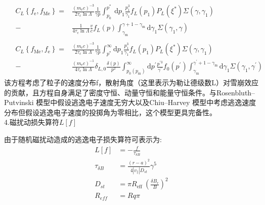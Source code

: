 \begin{align}
 &\begin{aligned}
C_{L}\left\{f_{\mathrm{e}}, f_{\mathrm{Me}}\right\} =& \frac{\left(m_{\mathrm{e}} c\right)^{-3}}{2 \tau_{\mathrm{c}} \ln \Lambda} \frac{1}{\gamma p} \int_{p_{0}}^{p^{*}} \mathrm{~d} p_{1} \frac{p_{1}^{3}}{\gamma_{1}} f_{L}\left(p_{1}\right) P_{L}\left(\xi^{*}\right) \Sigma\left(\gamma, \gamma_{1}\right) \\
- &\frac{1}{4 \tau_{\mathrm{c}} \ln \Lambda} \frac{v}{c} f_{L}(p) \int_{\gamma_{\mathrm{m}}}^{\gamma+1-\gamma_{\mathrm{m}}} \mathrm{d} \gamma_{1} \Sigma\left(\gamma_{1}, \gamma\right) 
\end{aligned} \label{eq:CLfefMe} \\ 
 &\begin{aligned}
C_{L}\left\{f_{\mathrm{Me}}, f_{\mathrm{e}}\right\}  =& \frac{\left(m_{\mathrm{e}} c\right)^{-3}}{2 \tau_{\mathrm{c}} \ln \Lambda} \frac{1}{\gamma p} \int_{p^{*}}^{\infty} \mathrm{d} p_{1} \frac{p_{1}^{3}}{\gamma_{1}} f_{L}\left(p_{1}\right) P_{L}\left(\xi^{*}\right) \Sigma\left(\gamma, \gamma_{1}\right) \\
-&\frac{\left(m_{\mathrm{e}} c\right)^{-1}}{4 \tau_{\mathrm{c}} \ln \Lambda} \delta_{L, 0} \frac{\delta(p)}{p^{2}} \int_{p_{0}\left(p_{\mathrm{m}}\right)}^{\infty} \mathrm{d} p^{\prime} \frac{p^{\prime 3}}{\gamma^{\prime}} f_{0}\left(p^{\prime}\right) \int_{\gamma_{\mathrm{m}}}^{\gamma^{\prime}+1-\gamma_{\mathrm{m}}} \mathrm{d} \gamma_{1} \Sigma\left(\gamma_{1}, \gamma^{\prime}\right) \label{eq:CLfMefe}
\end{aligned} 
\end{align}
该方程考虑了粒子的速度分布f，散射角度（这里表示为勒让德级数L）对雪崩效应的贡献，且方程自身满足了密度守恒、动量守恒和能量守恒条件。与Rosenbluth–Putvinski\cite{RN1793} 模型中假设逃逸电子速度无穷大以及Chiu–Harvey\cite{RN1941} 模型中考虑逃逸速度分布但假设逃逸电子速度的投掷角为零相比，这个模型更具完备性。\\
4.磁扰动损失算符$L[f]$\par
由于随机磁扰动造成的逃逸电子损失算符可表示为\cite{RN2076,RN2086}:
\begin{equation}
\begin{aligned}
L[f] & = -\frac{f}{\tau_{\delta B}} \\
\tau_{\delta B} & = \frac{(r-a)^{2}}{4\left|v_{\|}\right| D_{s t}} \gamma^{5} \\
D_{s t} & = \pi R_{\text {eff }}\left(\frac{\delta B_{r}}{B}\right)^{2} \\
R_{e f f} & = R q \pi 
\end{aligned}\label{eq:Harvey}
\end{equation}
